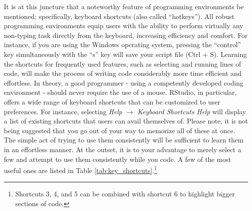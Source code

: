 It is at this juncture that a noteworthy feature of programming environments be mentioned; specifically, keyboard shortcuts (also called ``hotkeys''). All robust programming environments equip users with the ability to perform virtually any non-typing task directly from the keyboard, increasing efficiency and comfort. For instance, if you are using the Windows operating system, pressing the ``control'' key simultaneously with the ``s'' key will save your script file (Ctrl + S). Learning the shortcuts for frequently used features, such as selecting and running lines of code, will make the process of writing code considerably more time efficient and effortless.  In theory, a good programmer - using a competently developed coding environment - should never require the use of a mouse.  RStudio, in particular, offers a wide range of keyboard shortcuts that can be customized to user preferences.  For instance, selecting \textit{Help $\rightarrow$ Keyboard Shortcuts Help} will display a list of existing shortcuts that users can avail themselves of.  Please note, it is not being suggested that you go out of your way to memorize all of these at once. The simple act of trying to use them consistently will be sufficient to learn them in an effortless manner. At the outset, it is to your advantage to merely select a few and attempt to use them consistently while you code. A few of the most useful ones are listed in Table \ref{tab:key_shortcuts}.\footnote{Shortcuts 3, 4, and 5 can be combined with shortcut 6 to highlight bigger sections of code.}

\vspace{1em}



